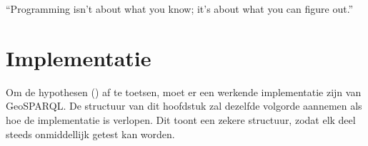 \begin{savequote}[0.55\linewidth]
	``Programming isn't about what you know; it's about what you can figure out.''
\end{savequote}

\chapter{Implementatie}
\label{chap:implementatie}
Om de hypothesen () af te toetsen, moet er een werkende implementatie zijn van GeoSPARQL. De structuur van dit hoofdstuk zal dezelfde volgorde aannemen als hoe de implementatie is verlopen. Dit toont een zekere structuur, zodat elk deel steeds onmiddellijk getest kan worden. 


 
\newpage
 
\newpage
 
\newpage
 
\newpage
 
\newpage
 
\newpage
 
\newpage